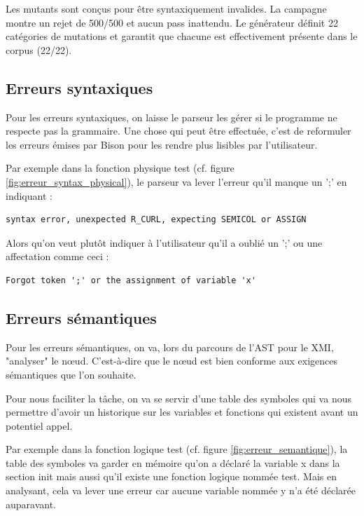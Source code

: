 \documentclass[a4paper, 11pt]{article}
\begin{document}
Les mutants sont conçus pour être syntaxiquement invalides. La campagne montre un rejet de 500/500 et aucun pass inattendu.
Le générateur définit 22 catégories de mutations et garantit que chacune est effectivement présente dans le corpus (22/22).



\subsection{Erreurs syntaxiques}

Pour les erreurs syntaxiques, on laisse le parseur les gérer si le programme ne respecte pas la grammaire. Une chose qui peut être effectuée, c'est de reformuler les erreurs émises par Bison pour les rendre plus lisibles par l'utilisateur.

Par exemple dans la fonction physique test (cf. figure \ref{fig:erreur_syntax_physical}), le parseur va lever l'erreur qu'il manque un ';' en indiquant :
\begin{lstlisting}[caption={Message d'erreur syntaxique brut émis par Bison}, label={lst:syntax-error-raw}]
syntax error, unexpected R_CURL, expecting SEMICOL or ASSIGN
\end{lstlisting}

Alors qu'on veut plutôt indiquer à l'utilisateur qu'il a oublié un ';' ou une affectation comme ceci :
\begin{lstlisting}[caption={Message d'erreur reformulé pour l'utilisateur}, label={lst:syntax-error-friendly}]
Forgot token ';' or the assignment of variable 'x'
\end{lstlisting}

\newpage
\subsection{Erreurs sémantiques}

Pour les erreurs sémantiques, on va, lors du parcours de l'AST pour le XMI, "analyser" le nœud. C'est-à-dire que le nœud est bien conforme aux exigences sémantiques que l'on souhaite.

Pour nous faciliter la tâche, on va se servir d'une table des symboles qui va nous permettre d'avoir un historique sur les variables et fonctions qui existent avant un potentiel appel.

Par exemple dans la fonction logique test (cf. figure \ref{fig:erreur_semantique}), la table des symboles va garder en mémoire qu'on a déclaré la variable x dans la section init mais aussi qu'il existe une fonction logique nommée test. Mais en analysant, cela va lever une erreur car aucune variable nommée y n'a été déclarée auparavant.
\end{document}
